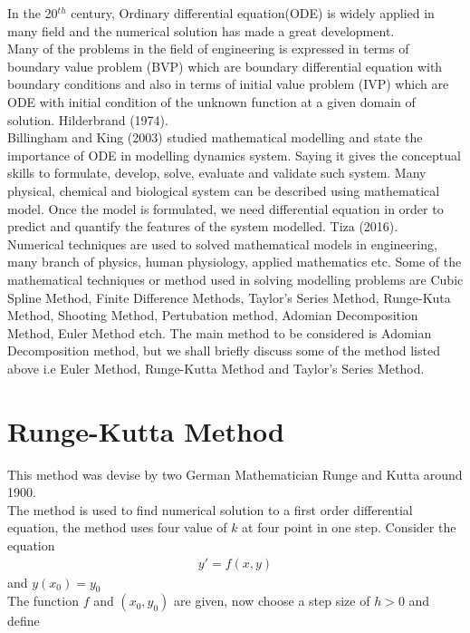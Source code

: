 \documentclass[11pt]{report}
\newcommand{\NI}{\noindent}
\newcommand{\sprime}{'}
\begin{document}
	\NI In the 20$^{th}$ century, Ordinary differential equation(ODE) is widely applied in many field and the numerical solution has made a great development.\\
	
	\NI Many of the problems in the field of engineering is expressed in terms of boundary value problem (BVP) which are boundary differential equation with boundary conditions and also in terms of initial value problem (IVP) which are ODE with initial condition of the unknown function at a given domain of solution. Hilderbrand (1974).\\
	
	\NI Billingham and King (2003) studied mathematical modelling and state the importance of ODE in modelling dynamics system. Saying it gives the conceptual skills to formulate, develop, solve, evaluate and validate such system. Many physical, chemical and biological system can be described using mathematical model. Once the model is formulated, we need differential equation in order to predict and quantify the features of the system modelled. Tiza (2016).\\
	
	\NI Numerical techniques are used to solved mathematical models in engineering, many branch of physics, human physiology, applied mathematics etc. Some of the mathematical techniques or method used in solving modelling problems are Cubic Spline Method, Finite Difference Methods, Taylor's Series Method, Runge-Kuta Method, Shooting Method, Pertubation method, Adomian Decomposition Method, Euler Method etch. The main method to be considered is Adomian Decomposition method, but we shall briefly discuss some of the method listed above i.e Euler Method, Runge-Kutta Method and Taylor's Series Method.
	
	\section{Runge-Kutta Method}
	This method was devise by two German Mathematician Runge and Kutta around 1900.\\
	The method is used to find numerical solution to a first order differential equation, the method uses four value of $k$ at four point in one step. Consider the equation
	\begin{eqnarray}
		y\sprime = f(x,y)
	\end{eqnarray}
	and $y(x_0)=y_0$\\
	The function $f$ and $(x_0,y_0)$ are given, now choose a step size of $h>0$ and define
	
\end{document}
